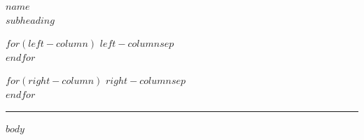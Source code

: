 \documentclass[9pt]{extarticle}
\begin{document}
\begin{center}
    {\huge\bfseries $name$} \\
    $subheading$
\end{center}

\vspace{-6pt}

\noindent
\begin{minipage}[t]{0.5\textwidth}
    $for(left-column)$
    $left-column$$sep$\\
    $endfor$
\end{minipage}%
\begin{minipage}[t]{0.5\textwidth}
    \raggedleft
    $for(right-column)$
    $right-column$$sep$\\
    $endfor$
\end{minipage}

\vspace{6pt}
\hrule
\vspace{2pt}

$body$
\end{document}
